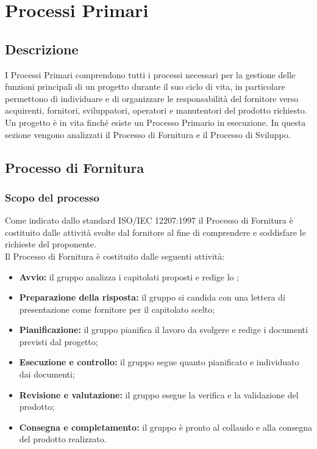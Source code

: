 \section{Processi Primari}
\subsection{Descrizione}\label{PP_Descrizione}
I Processi Primari comprendono tutti i processi necessari per la gestione delle funzioni principali di un progetto durante il suo ciclo di vita, in particolare permettono di individuare e di organizzare le responsabilità del fornitore verso acquirenti, fornitori, sviluppatori, operatori e manutentori del prodotto richiesto. \\
Un progetto è in vita finché esiste un Processo Primario in esecuzione.
In questa sezione vengono analizzati il Processo di Fornitura e il Processo di Sviluppo.

\subsection{Processo di Fornitura}
\subsubsection{Scopo del processo}\label{PF_Scopo}
Come indicato dallo standard ISO/IEC 12207:1997 il Processo di Fornitura è costituito dalle attività svolte dal fornitore al fine di comprendere e soddisfare le richieste del proponente. \\
Il Processo di Fornitura è costituito dalle seguenti attività:
\begin{itemize}
	\item \textbf{Avvio:} il gruppo analizza i capitolati proposti e redige lo \SdFv;
	\item \textbf{Preparazione della risposta:} il gruppo si candida con una lettera di presentazione come fornitore per il capitolato scelto;
	\item \textbf{Pianificazione:} il gruppo pianifica il lavoro da svolgere e redige i documenti previsti dal progetto;
	\item \textbf{Esecuzione e controllo:} il gruppo segue quanto pianificato e individuato dai documenti;
	\item \textbf{Revisione e valutazione:} il gruppo esegue la verifica e la validazione del prodotto;
	\item \textbf{Consegna e completamento:} il gruppo è pronto al collaudo e alla consegna del prodotto realizzato.
\end{itemize}

